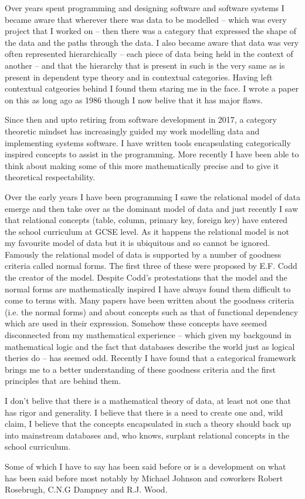 \documentclass[12pt,a4paper]{article}
\begin{document}
Over years spent programming and designing software and software systems I became aware
that wherever there was data to be modelled -- which was every project that I worked on -- then there was a category that expressed the shape of the data and the paths through the data.  
I also became aware that data was very often represented hierarchically 
-- each piece of data being held in the context of another -- and that the hierarchy that is present in  such is the very same as is present in dependent type theory and in contextual categories.
Having left contextual catgeories behind I found them staring me in the face.
I wrote a paper on this as long ago as 1986 though I now belive that it has major flaws. 

Since then and upto retiring from software development in 2017, a category theoretic mindset has increasingly guided my work modelling data and implementing  systems software. I have written  tools 
encapsulating categorically inspired concepts  to assist in the programming. More recently I have been able to think about  making some of this more mathematically precise and  to give it  theoretical respectability. 

Over the early years I have been programming I sawe the relational model of data emerge 
and then take over as the dominant model of data 
and just recently I saw that relational concepts (table, column, primary key, foreign key) 
have entered the school curriculum at GCSE level.  
As it happens the relational model is not my favourite model of data but it is ubiquitous and so cannot be ignored. Famously the relational model of data is supported by a number of goodness criteria called normal forms. The first three of these were proposed by E.F. Codd the creator of the model. 
Despite Codd's protestations that the model and the normal forms are mathematically inspired I have 
always found them difficult to come to terms with. 
Many papers have been written about the goodness criteria (i.e. the normal forms) 
and about concepts such as that of functional dependency
which are used in their expression. Somehow these concepts have seemed disconnected from my mathematical experience -- which given my backgound in mathematical logic 
and the fact that databases describe the world just as logical theries do -- has seemed odd. 
Recently I have found that a categorical framework brings me to a better understanding of these 
goodness criteria and the first principles that are behind them. 

I don't belive that there is a mathematical theory of data, at least not one that has rigor and generality. 
I believe that there is a need to create one and, wild claim,  I believe that the concepts encapsulated in such a theory should back up into mainstream databases and, who knows, surplant relational concepts in the school curriculum.

Some of which I have to say has been said before or is a development on what has been said before
most notably by Michael Johnson and coworkers Robert Rosebrugh, C.N.G Dampney and R.J. Wood.
\end{document}
